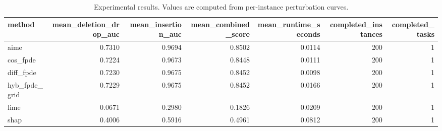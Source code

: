 \begin{table}[t]
\caption{Experimental results. Values are computed from per-instance perturbation curves.}
\label{tab:main_results_computed}
\centering
\begin{tabular}{lrrrrrr}
\toprule
method & mean\_deletion\_drop\_auc & mean\_insertion\_auc & mean\_combined\_score & mean\_runtime\_seconds & completed\_instances & completed\_tasks \\
\midrule
aime & 0.7310 & 0.9694 & 0.8502 & 0.0114 & 200 & 1 \\
cos\_fpde & 0.7224 & 0.9673 & 0.8448 & 0.0111 & 200 & 1 \\
diff\_fpde & 0.7230 & 0.9675 & 0.8452 & 0.0098 & 200 & 1 \\
hyb\_fpde\_grid & 0.7229 & 0.9675 & 0.8452 & 0.0166 & 200 & 1 \\
lime & 0.0671 & 0.2980 & 0.1826 & 0.0209 & 200 & 1 \\
shap & 0.4006 & 0.5916 & 0.4961 & 0.0812 & 200 & 1 \\
\bottomrule
\end{tabular}

\end{table}
